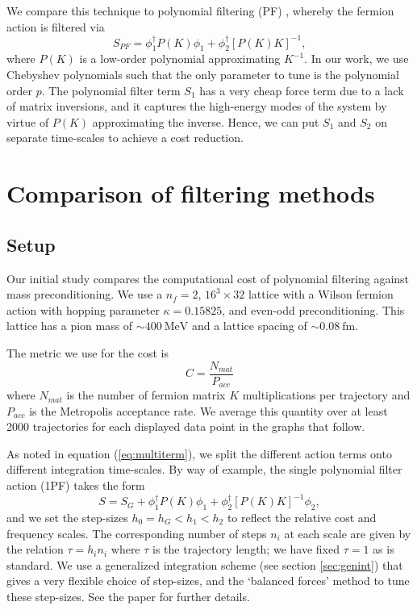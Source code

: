 We compare this technique to polynomial filtering (PF) \cite{Kamleh:2011dc}, whereby the fermion action is filtered via
\begin{equation}
	S_{PF} = \phi_1^\dag P(K) \phi_1 + \phi_2^\dag [P(K)K]^{-1},
\end{equation}
where $P(K)$ is a low-order polynomial approximating $K^{-1}$. In our work, we use Chebyshev polynomials such that the only parameter to tune is the polynomial order $p$. The polynomial filter term $S_1$ has a very cheap force term due to a lack of matrix inversions, and it captures the high-energy modes of the system by virtue of $P(K)$ approximating the inverse. Hence, we can put $S_1$ and $S_2$ on separate time-scales to achieve a cost reduction.



\section{Comparison of filtering methods} \label{sec:pf_v_mp}
\subsection{Setup}
Our initial study compares the computational cost of polynomial filtering against mass preconditioning.
We use a $n_f = 2$, $16^3 \times 32$ lattice with a Wilson fermion action with hopping parameter $\kappa = 0.15825$, and even-odd preconditioning. This lattice has a pion mass of $\sim 400\ \mathrm{MeV}$ and a lattice spacing of $\sim 0.08\ \mathrm{fm}$.

The metric we use for the cost is
\begin{equation}
	C = \frac{N_{mat}}{P_{acc}} \label{eq:cost}
\end{equation}
where $N_{mat}$ is the number of fermion matrix $K$ multiplications per trajectory and $P_{acc}$ is the Metropolis acceptance rate. We average this quantity over at least 2000 trajectories for each displayed data point in the graphs that follow.

As noted in equation (\ref{eq:multiterm}), we split the different action terms onto different integration time-scales. By way of example, the single polynomial filter action (1PF) takes the form
\begin{equation}
	S = S_G + \phi_1^\dag P(K) \phi_1 + \phi_2^\dag [P(K)K]^{-1} \phi_2,
\end{equation}
and we set the step-sizes $h_0 = h_G < h_1 < h_2$ to reflect the relative cost and frequency scales.
The corresponding number of steps $n_i$ at each scale are given by the relation $\tau = h_i n_i$ where $\tau$ is the trajectory length; we have fixed $\tau = 1$ as is standard.
We use a generalized integration scheme (see section \ref{sec:genint}) that gives a very flexible choice of step-sizes, and the `balanced forces' method to tune these step-sizes. See the paper \cite{Haar:2016bwe} for further details.

